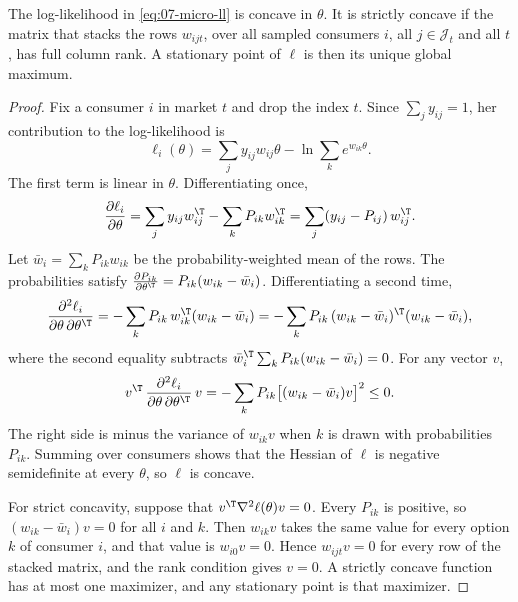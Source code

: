 \begin{proposition}\label{prop:07-ml-concave}
The log-likelihood in \eqref{eq:07-micro-ll} is concave in $\theta$. It is strictly concave if the matrix that
stacks the rows $w_{ijt}$, over all sampled consumers $i$, all $j \in \mathcal{J}_t$ and all $t$, has full
column rank. A stationary point of $\ell$ is then its unique global maximum.
\end{proposition}

\begin{proof}
Fix a consumer $i$ in market $t$ and drop the index $t$. Since $\sum_j y_{ij} = 1$, her contribution to the
log-likelihood is
\begin{equation*}
  \ell_i(\theta) = \sum_j y_{ij}w_{ij}\theta - \ln\sum_k e^{w_{ik}\theta} .
\end{equation*}
The first term is linear in $\theta$. Differentiating once,
\begin{equation*}
  \frac{\partial \ell_i}{\partial \theta}
  = \sum_j y_{ij}w_{ij}^\T - \sum_k P_{ik}w_{ik}^\T
  = \sum_j (y_{ij} - P_{ij})\,w_{ij}^\T .
\end{equation*}
Let $\bar w_i = \sum_k P_{ik}w_{ik}$ be the probability-weighted mean of the rows. The probabilities satisfy
$\frac{\partial P_{ik}}{\partial \theta^\T} = P_{ik}(w_{ik} - \bar w_i)$. Differentiating a second time,
\begin{equation*}
  \frac{\partial^2 \ell_i}{\partial \theta\,\partial \theta^\T}
  = -\sum_k P_{ik}\,w_{ik}^\T(w_{ik} - \bar w_i)
  = -\sum_k P_{ik}\,(w_{ik} - \bar w_i)^\T(w_{ik} - \bar w_i),
\end{equation*}
where the second equality subtracts $\bar w_i^\T\sum_k P_{ik}(w_{ik} - \bar w_i) = 0$. For any vector $v$,
\begin{equation*}
  v^\T\,\frac{\partial^2 \ell_i}{\partial \theta\,\partial \theta^\T}\,v
  = -\sum_k P_{ik}\big[(w_{ik} - \bar w_i)v\big]^2 \le 0 .
\end{equation*}
The right side is minus the variance of $w_{ik}v$ when $k$ is drawn with probabilities $P_{ik}$. Summing over
consumers shows that the Hessian of $\ell$ is negative semidefinite at every $\theta$, so $\ell$ is concave.

For strict concavity, suppose that $v^\T\nabla^2\ell(\theta)v = 0$. Every $P_{ik}$ is positive, so
$(w_{ik} - \bar w_i)v = 0$ for all $i$ and $k$. Then $w_{ik}v$ takes the same value for every option $k$ of
consumer $i$, and that value is $w_{i0}v = 0$. Hence $w_{ijt}v = 0$ for every row of the stacked matrix, and
the rank condition gives $v = 0$. A strictly concave function has at most one maximizer, and any stationary
point is that maximizer.
\end{proof}


